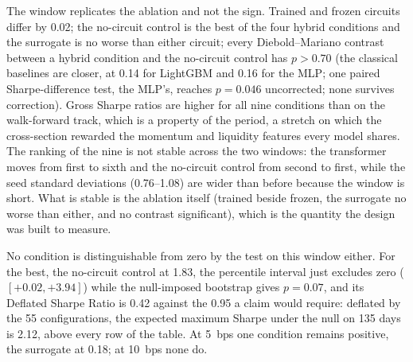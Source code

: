 The window replicates the ablation and not the sign. Trained and frozen
circuits differ by \num{0.02}; the no-circuit control is the best of the four
hybrid conditions and the surrogate is no worse than either circuit; every
Diebold--Mariano contrast between a hybrid condition and the no-circuit control
has $p > 0.70$ (the classical baselines are closer, at \num{0.14} for LightGBM
and \num{0.16} for the MLP; one paired Sharpe-difference test, the MLP's,
reaches $p = 0.046$ uncorrected; none survives correction). Gross Sharpe
ratios are higher for all nine conditions than on the walk-forward track, which is a property of the
period, a stretch on which the cross-section rewarded the momentum and
liquidity features every model shares. The ranking of the nine is not stable
across the two windows: the transformer moves from first to sixth and the
no-circuit control from second to first, while the seed standard deviations
(\numrange{0.76}{1.08}) are wider than before because the window is short. What
is stable is the ablation itself (trained beside frozen, the surrogate no
worse than either, and no contrast significant), which is the quantity the
design was built to measure.

No condition is distinguishable from zero by the test on this window either.
For the best, the no-circuit control at \num{+1.83}, the percentile interval
just excludes zero ($[+0.02, +3.94]$) while the null-imposed bootstrap gives
$p = 0.07$, and its Deflated Sharpe Ratio is \num{0.42} against the
\num{0.95} a claim would require: deflated by the \num{55} configurations, the
expected maximum Sharpe under the null on \num{135} days is \num{2.12}, above
every row of the table. At \SI{5}{bps} one condition remains positive, the
surrogate at \num{+0.18}; at \SI{10}{bps} none do.
